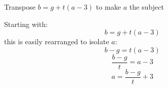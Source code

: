 \documentclass[a4paper, 12pt]{report}
\begin{document}
    \newpage
    \begin{tcolorbox}[title=\color{black}{\section{Q10}}, colback=white, colframe=black!30!white, boxrule=0.4mm, width=1\textwidth]
        Transpose \( b=g+t(a-3) \) to make \( a \) the subject
    \end{tcolorbox}
    
    Starting with:
    \[b = g + t(a - 3)\]
    this is easily rearranged to isolate \( a \):
    \[b - g = t(a - 3)\]
    \[\frac{b - g}{t} = a - 3\]
    \[\boxed{a = \frac{b - g}{t} + 3}\]
    
    \newpage

    
\end{document}
